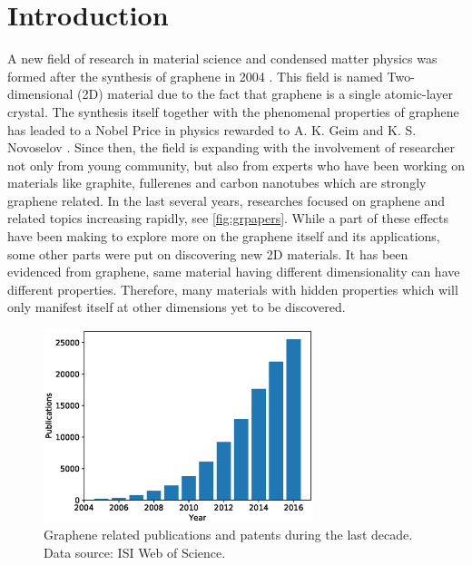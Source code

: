 
\chapter{Introduction \label{chap:1}}  %

\ifpdf
    \graphicspath{{Chapter1/Figs/Raster/}{Chapter1/Figs/PDF/}{Chapter1/Figs/}{Chapter1/Figs/Vector/}}
\else
    \graphicspath{{Chapter1/Figs/Vector/}{Chapter1/Figs/}}
\fi

A new field of research in material science and condensed matter physics was formed after the synthesis of graphene in 2004 \cite{Novoselov666,Novoselov26072005}. This field is named Two-dimensional (2D) material due to the fact that graphene is a single atomic-layer crystal. The synthesis itself together with the phenomenal properties of graphene has leaded to a Nobel Price in physics rewarded to A. K. Geim and K. S. Novoselov \cite{Geim2007}. Since then, the field is expanding with the involvement of researcher not only from young community, but also from experts who have been working on materials like graphite, fullerenes and carbon nanotubes which are strongly graphene related. In the last several years, researches focused on graphene and related topics increasing rapidly, see \autoref{fig:grpapers}. While a part of these effects have been making to explore more on the graphene itself and its applications, some other parts were put on discovering new 2D materials. It has been evidenced from graphene, same material having different dimensionality can have different properties. Therefore, many materials with hidden properties which will only manifest itself at other dimensions yet to be discovered. 


\begin{figure}[htbp!] 
\centering  
\includegraphics[width=0.7\textwidth]{graphene_papers.eps}
\caption[Graphene publications]{Graphene related publications and patents during the last decade. Data source: ISI Web of Science. \protect\footnotemark }  
\label{fig:grpapers}
\end{figure} 


